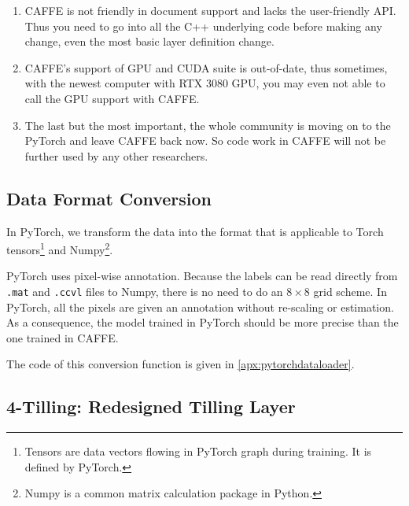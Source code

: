 \begin{spacing}{1.5}
\begin{enumerate}
    \item CAFFE is not friendly in document support and lacks the user-friendly API. Thus you need to go into all the C++ underlying code before making any change, even the most basic layer definition change. 

    \item CAFFE's support of GPU and CUDA suite is out-of-date, thus sometimes, with the newest computer with RTX 3080 GPU, you may even not able to call the GPU support with CAFFE. 

    \item The last but the most important, the whole community is moving on to the PyTorch and leave CAFFE back now. So code work in CAFFE will not be further used by any other researchers.
    
\end{enumerate}

\subsection{Data Format Conversion}

In PyTorch, we transform the data into the format that is applicable to Torch tensors\footnote{Tensors are data vectors flowing in PyTorch graph during training. It is defined by PyTorch.} and Numpy\footnote{Numpy is a common matrix calculation package in Python.}. 

PyTorch uses pixel-wise annotation. Because the labels can be read directly from \texttt{.mat} and \texttt{.ccvl} files to Numpy, there is no need to do an $8 \times 8$ grid scheme. In PyTorch, all the pixels are given an annotation without re-scaling or estimation. As a consequence, the model trained in PyTorch should be more precise than the one trained in CAFFE.

The code of this conversion function is given in \autoref{apx:pytorchdataloader}.

\subsection{4-Tilling: Redesigned Tilling Layer}


\end{spacing}

